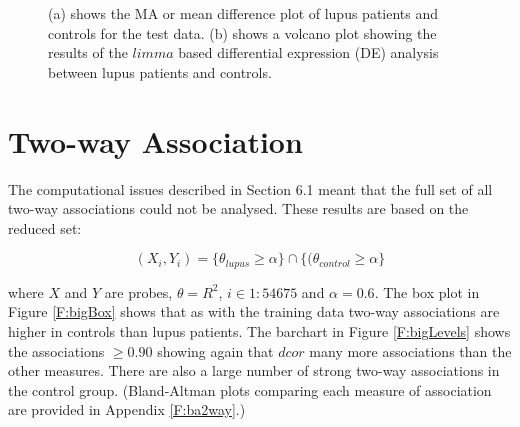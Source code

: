 \documentclass[a4paper, 12pt]{report}
\begin{document}
\begin{figure}[H]
    \centering
    \qquad    
    \caption{(a) shows the MA or mean difference plot of lupus patients and controls for the test data. (b) shows a volcano plot showing the results of the $limma$ based differential expression (DE) analysis between lupus patients and controls.}
    \label{F:BDVolcano}
\end{figure}

\section{Two-way Association}
The computational issues described in Section 6.1 meant that the full set of all two-way associations could not be analysed. These results are based on the reduced set:


\[
(X_i, Y_i) = \{\theta_{lupus} \ge \alpha \} \cap \{ (\theta_{control}  \ge \alpha \}
\]

where $X$ and $Y$ are probes, $\theta = R^2$, $i \in {1:54675}$ and $\alpha = 0.6$. The box plot in Figure \ref{F:bigBox} shows that as with the training data two-way associations are higher in controls than lupus patients. The barchart in Figure \ref{F:bigLevels} shows the associations $\ge 0.90$ showing again that $dcor$ many more associations than the other measures. There are also a large number of strong two-way associations in the control group. (Bland-Altman plots comparing each measure of association are provided in Appendix \ref{F:ba2way}.)
\end{document}

